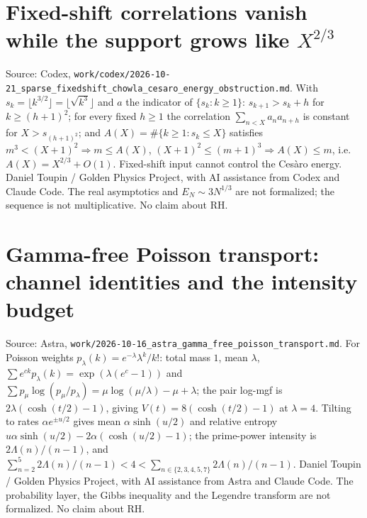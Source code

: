 \documentclass{report}
\theoremstyle{definition}
\begin{document}
\begin{itemize}
\begin{itemize}
\section{Fixed-shift correlations vanish while the support grows like \texorpdfstring{$X^{2/3}$}{X\^{}(2/3)}}
Source: Codex, \texttt{work/codex/2026-10-21\_sparse\_fixedshift\_chowla\_cesaro\_energy\_obstruction.md}. With $s_k=\lfloor k^{3/2}\rfloor=\lfloor\sqrt{k^3}\rfloor$ and $a$ the
indicator of $\{s_k:k\ge1\}$: $s_{k+1}>s_k+h$ for $k\ge(h+1)^2$; for every fixed $h\ge1$ the correlation $\sum_{n<X}a_na_{n+h}$ is constant for $X>s_{(h+1)^2}$; and
$A(X)=\#\{k\ge1:s_k\le X\}$ satisfies $m^3<(X+1)^2\Rightarrow m\le A(X)$, $(X+1)^2\le(m+1)^3\Rightarrow A(X)\le m$, i.e.\ $A(X)=X^{2/3}+O(1)$. Fixed-shift input
cannot control the Ces\`aro energy. Daniel Toupin / Golden Physics Project, with AI assistance from Codex and Claude Code. The real asymptotics and $E_N\sim3N^{1/3}$ are
not formalized; the sequence is not multiplicative. No claim about RH.

\section{Gamma-free Poisson transport: channel identities and the intensity budget}
Source: Astra, \texttt{work/2026-10-16\_astra\_gamma\_free\_poisson\_transport.md}. For Poisson weights $p_\lambda(k)=e^{-\lambda}\lambda^k/k!$: total mass $1$, mean $\lambda$,
$\sum e^{ck}p_\lambda(k)=\exp(\lambda(e^c-1))$ and $\sum p_\mu\log(p_\mu/p_\lambda)=\mu\log(\mu/\lambda)-\mu+\lambda$; the pair log-mgf is $2\lambda(\cosh(t/2)-1)$, giving
$V(t)=8(\cosh(t/2)-1)$ at $\lambda=4$. Tilting to rates $\alpha e^{\pm u/2}$ gives mean $\alpha\sinh(u/2)$ and relative entropy $u\alpha\sinh(u/2)-2\alpha(\cosh(u/2)-1)$; the
prime-power intensity is $2\Lambda(n)/(n-1)$, and $\sum_{n=2}^5 2\Lambda(n)/(n-1)<4<\sum_{n\in\{2,3,4,5,7\}}2\Lambda(n)/(n-1)$. Daniel Toupin / Golden Physics Project,
with AI assistance from Astra and Claude Code. The probability layer, the Gibbs inequality and the Legendre transform are not formalized. No claim about RH.


\end{itemize}
\end{itemize}
\end{document}
